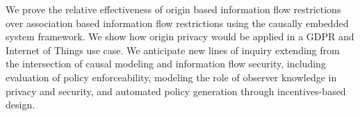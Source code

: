 \documentclass[../thesis.tex]{subfiles}
\begin{document}
We prove the relative effectiveness of
origin based information flow restrictions over
association based information flow restrictions
using the causally embedded system framework.
We show how origin privacy would be applied in
a GDPR and Internet of Things use case.
We anticipate new lines of inquiry extending
from the intersection of causal modeling
and information flow security, including
evaluation of policy enforceability,
modeling the role of observer knowledge
in privacy and security, and automated
policy generation through incentives-based
design.
\end{document}

